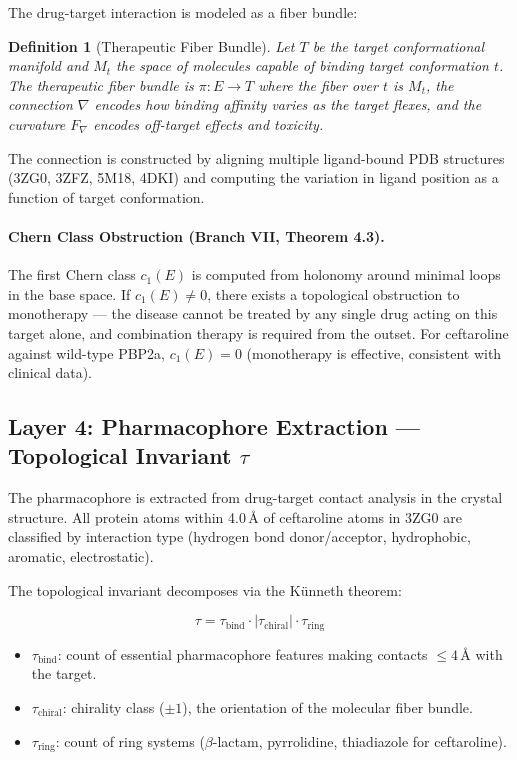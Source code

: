 \documentclass[11pt]{article}
\newtheorem{definition}[theorem]{Definition}
\begin{document}
The drug-target interaction is modeled as a fiber bundle:

\begin{definition}[Therapeutic Fiber Bundle]
Let $T$ be the target conformational manifold and $M_t$ the space of molecules capable of
binding target conformation $t$. The therapeutic fiber bundle is $\pi: E \to T$ where the
fiber over $t$ is $M_t$, the connection $\nabla$ encodes how binding affinity varies as the
target flexes, and the curvature $F_\nabla$ encodes off-target effects and toxicity.
\end{definition}

The connection is constructed by aligning multiple ligand-bound PDB structures
(3ZG0, 3ZFZ, 5M18, 4DKI) and computing the variation in ligand position as a function
of target conformation.

\paragraph{Chern Class Obstruction (Branch VII, Theorem 4.3).}
The first Chern class $c_1(E)$ is computed from holonomy around minimal loops in the base
space. If $c_1(E) \neq 0$, there exists a topological obstruction to monotherapy — the
disease cannot be treated by any single drug acting on this target alone, and combination
therapy is required from the outset. For ceftaroline against wild-type PBP2a, $c_1(E) = 0$
(monotherapy is effective, consistent with clinical data).

\subsection{Layer 4: Pharmacophore Extraction — Topological Invariant $\tau$}

The pharmacophore is extracted from drug-target contact analysis in the crystal structure.
All protein atoms within 4.0\,\AA{} of ceftaroline atoms in 3ZG0 are classified by
interaction type (hydrogen bond donor/acceptor, hydrophobic, aromatic, electrostatic).

The topological invariant decomposes via the K\"unneth theorem:

\begin{equation}\label{eq:tau}
\tau = \tau_{\text{bind}} \cdot |\tau_{\text{chiral}}| \cdot \tau_{\text{ring}}
\end{equation}

\begin{itemize}[leftmargin=*]
    \item $\tau_{\text{bind}}$: count of essential pharmacophore features making contacts
    $\leq 4$\,\AA{} with the target.
    \item $\tau_{\text{chiral}}$: chirality class ($\pm 1$), the orientation of the
    molecular fiber bundle.
    \item $\tau_{\text{ring}}$: count of ring systems ($\beta$-lactam, pyrrolidine,
    thiadiazole for ceftaroline).
\end{itemize}
\end{document}
